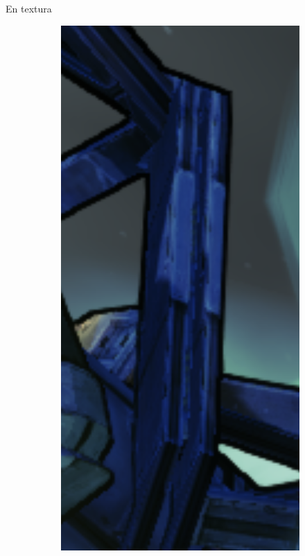 \documentclass[table]{beamer}
\begin{document}
\begin{frame}[fragile]{En textura}
\begin{figure}[!htbp]
\begin{subfigure}[b]{0.45\textwidth}
        \end{subfigure}
        \centering
        \begin{subfigure}[b]{0.45\textwidth}
            \includegraphics[width=\textwidth]{figures/ss2off.png}
        \end{subfigure}
    \end{figure}
\end{frame}
\end{document}

